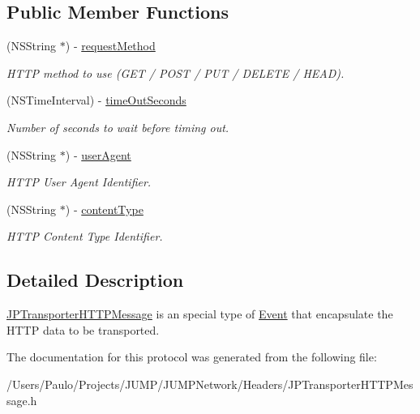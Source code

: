 \subsection*{Public Member Functions}
\begin{DoxyCompactItemize}
\item 
\hypertarget{a00040_a0ed49760ae9138e2e7e5d7b8acde745b}{
(NSString $\ast$) -\/ \hyperlink{a00040_a0ed49760ae9138e2e7e5d7b8acde745b}{requestMethod}}
\label{a00040_a0ed49760ae9138e2e7e5d7b8acde745b}

\begin{DoxyCompactList}\small\item\em HTTP method to use (GET / POST / PUT / DELETE / HEAD). \item\end{DoxyCompactList}\item 
\hypertarget{a00040_a6d9652a819ac429e1c09b095d0424872}{
(NSTimeInterval) -\/ \hyperlink{a00040_a6d9652a819ac429e1c09b095d0424872}{timeOutSeconds}}
\label{a00040_a6d9652a819ac429e1c09b095d0424872}

\begin{DoxyCompactList}\small\item\em Number of seconds to wait before timing out. \item\end{DoxyCompactList}\item 
\hypertarget{a00040_a70431efd75f797fd2321dff4ed11499e}{
(NSString $\ast$) -\/ \hyperlink{a00040_a70431efd75f797fd2321dff4ed11499e}{userAgent}}
\label{a00040_a70431efd75f797fd2321dff4ed11499e}

\begin{DoxyCompactList}\small\item\em HTTP User Agent Identifier. \item\end{DoxyCompactList}\item 
\hypertarget{a00040_a2367186c814d6edbf34b085d2341f29c}{
(NSString $\ast$) -\/ \hyperlink{a00040_a2367186c814d6edbf34b085d2341f29c}{contentType}}
\label{a00040_a2367186c814d6edbf34b085d2341f29c}

\begin{DoxyCompactList}\small\item\em HTTP Content Type Identifier. \item\end{DoxyCompactList}\end{DoxyCompactItemize}


\subsection{Detailed Description}
\hyperlink{a00040}{JPTransporterHTTPMessage} is an special type of \hyperlink{a00005}{Event} that encapsulate the HTTP data to be transported. 

The documentation for this protocol was generated from the following file:\begin{DoxyCompactItemize}
\item 
/Users/Paulo/Projects/JUMP/JUMPNetwork/Headers/JPTransporterHTTPMessage.h\end{DoxyCompactItemize}
